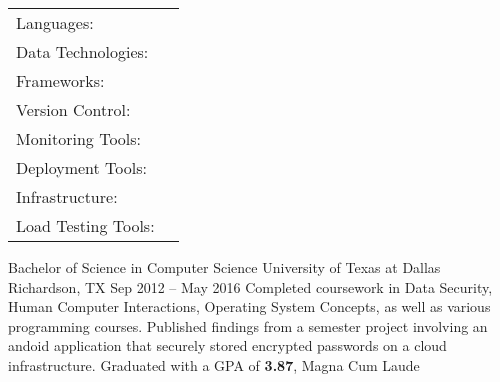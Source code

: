 \documentclass[]{awesome-cv}
\begin{document}
\begin{cventries}
\vspace{-2.5mm}
	\cventry
	{}
	{\def\arraystretch{1.15}{\begin{tabular}{ l l }
		Languages:  & {\skill{ Java, Typescript, Javascript, Python, C\#, C++, C, Groovy, Haskell, \LaTeX}} \\
		Data Technologies:  & {\skill{ DynamoDB, Redis, MySQL, PostgreSQL, Oracle SQL, IBM MQ, Rabbit MQ, ElasticSearch}} \\
		Frameworks:  & {\skill{ Spring, ReactJS, GatsbyJS, AngularJS, ASP.NET}} \\
		Version Control:  & {\skill{ GIT}} \\
		Monitoring Tools: & {\skill{ Splunk, Grafana, Dynatrace}} \\
		Deployment Tools: & {\skill{ Gitlab CI/CD, GitpOps, ArgoCD, Jenkins, Scalr}} \\
		Infrastructure: &{\skill{ Cloud Foundry, Docker, Kubernetes, Red Hat OpenShift, AWS}}\\
		Load Testing Tools: & {\skill{ K6, Gatling, Karate}} \\
		\end{tabular}}}
	{}
	{}
	{}
\end{cventries}
\vspace{-5mm}
\begin{cventries}
	\cventry
	{Bachelor of Science in Computer Science}
	{University of Texas at Dallas}
	{Richardson, TX}
	{Sep 2012 – May 2016}
	{Completed coursework in Data Security, Human Computer Interactions, Operating System Concepts, as well as various programming courses. Published findings from a semester project involving an andoid application that securely stored encrypted passwords on a cloud infrastructure. \newline
    	Graduated with a GPA of \textbf{3.87}, Magna Cum Laude}
\end{cventries}

\vspace{-2mm}


\ 
\end{document}
